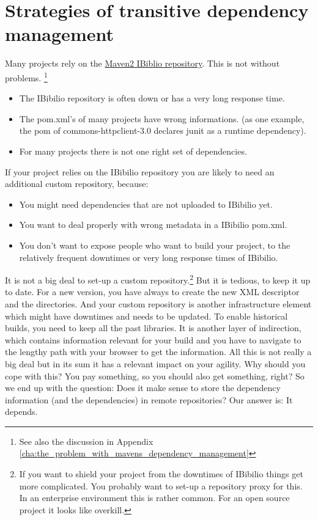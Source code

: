 \section{Strategies of transitive dependency management} %
\label{sec:strategies_of_transitive_dependency_management}
Many projects rely on the \href{http://repo1.maven.org/maven2}{Maven2 IBiblio repository}. This is not without problems. \footnote{See also the discussion in Appendix \ref{cha:the_problem_with_mavens_dependency_management}}
\begin{itemize}
	\item The IBibilio repository is often down or has a very long response time.
	\item The pom.xml's of many projects have wrong informations. (as one example, the pom of commons-httpclient-3.0 declares junit as a runtime dependency).
	\item For many projects there is not one right set of dependencies. 
\end{itemize} 
If your project relies on the IBibilio repository you are likely to need an additional custom repository, because:
\begin{itemize}
	\item You might need dependencies that are not uploaded to IBibilio yet.
	\item You want to deal properly with wrong metadata in a IBibilio pom.xml.
	\item You don't want to expose people who want to build your project, to the relatively frequent downtimes or very long response times of IBibilio. 
\end{itemize}
It is not a big deal to set-up a custom repository.\footnote{If you want to shield your project from the downtimes of IBibilio things get more complicated. You probably want to set-up a repository proxy for this. In an enterprise environment this is rather common. For an open source project it looks like overkill.} But it is tedious, to keep it up to date. For a new version, you have always to create the new XML descriptor and the directories. And your custom repository is another infrastructure element which might have downtimes and needs to be updated. To enable historical builds, you need to keep all the past libraries. It is another layer of indirection, which contains information relevant for your build and you have to navigate to the lengthy path with your browser to get the information. All this is not really a big deal but in its sum it has a relevant impact on your agility. Why should you cope with this? You pay something, so you should also get something, right? So we end up with the question: Does it make sense to store the dependency information (and the dependencies) in remote repositories? Our answer is: It depends.

